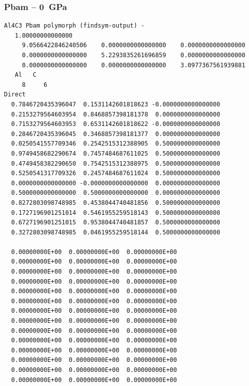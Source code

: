 \subsubsection*{Pbam -- 0~GPa}
\begin{footnotesize}
\begin{verbatim}
Al4C3 Pbam polymorph (findsym-output) - 
   1.00000000000000     
     9.0566422846240506    0.0000000000000000    0.0000000000000000
     0.0000000000000000    5.2293835261696859    0.0000000000000000
     0.0000000000000000    0.0000000000000000    3.0977367561939881
   Al   C 
     8     6
Direct
  0.7846720435396047  0.1531142601818623 -0.0000000000000000
  0.2153279564603954  0.8468857398181378  0.0000000000000000
  0.7153279564603953  0.6531142601818622 -0.0000000000000000
  0.2846720435396045  0.3468857398181377  0.0000000000000000
  0.0250541557709346  0.2542515312388905  0.5000000000000000
  0.9749458682290674  0.7457484687611025  0.5000000000000000
  0.4749458382290650  0.7542515312388975  0.5000000000000000
  0.5250541317709326  0.2457484687611024  0.5000000000000000
  0.0000000000000000 -0.0000000000000000  0.0000000000000000
  0.5000000000000000  0.5000000000000000  0.0000000000000000
  0.8272803098748985  0.4538044740481856  0.5000000000000000
  0.1727196901251014  0.5461955259518143  0.5000000000000000
  0.6727196901251015  0.9538044740481857  0.5000000000000000
  0.3272803098748985  0.0461955259518144  0.5000000000000000
 
  0.00000000E+00  0.00000000E+00  0.00000000E+00
  0.00000000E+00  0.00000000E+00  0.00000000E+00
  0.00000000E+00  0.00000000E+00  0.00000000E+00
  0.00000000E+00  0.00000000E+00  0.00000000E+00
  0.00000000E+00  0.00000000E+00  0.00000000E+00
  0.00000000E+00  0.00000000E+00  0.00000000E+00
  0.00000000E+00  0.00000000E+00  0.00000000E+00
  0.00000000E+00  0.00000000E+00  0.00000000E+00
  0.00000000E+00  0.00000000E+00  0.00000000E+00
  0.00000000E+00  0.00000000E+00  0.00000000E+00
  0.00000000E+00  0.00000000E+00  0.00000000E+00
  0.00000000E+00  0.00000000E+00  0.00000000E+00
  0.00000000E+00  0.00000000E+00  0.00000000E+00
  0.00000000E+00  0.00000000E+00  0.00000000E+00
\end{verbatim}
\end{footnotesize}

